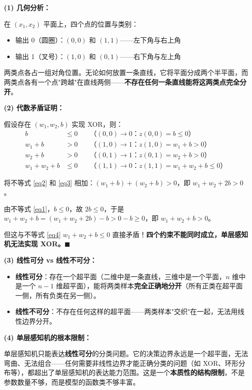 \documentclass[a4paper,11pt]{ctexart}
\begin{document}
\begin{solutionbox}[参考答案与详细解析]
    \textbf{(1) 几何分析：}

    在 $(x_1, x_2)$ 平面上，四个点的位置与类别：
    \begin{itemize}
        \item 输出 0（圆圈）：$(0,0)$ 和 $(1,1)$——左下角与右上角
        \item 输出 1（叉号）：$(1,0)$ 和 $(0,1)$——右下角与左上角
    \end{itemize}

    两类点各占一组对角位置。无论如何放置一条直线，它将平面分成两个半平面，而两类点各有一个点"跨越"在直线两侧——\textbf{不存在任何一条直线能将这两类点完全分开}。

    \textbf{(2) 代数矛盾证明：}

    假设存在 $(w_1, w_2, b)$ 实现 XOR，则：
    \begin{align}
        b &\leq 0 \quad &\text{（$(0,0) \to 0$：$z(0,0) = b \leq 0$）} \label{eq1}\\
        w_1 + b &> 0 \quad &\text{（$(1,0) \to 1$：$z(1,0) = w_1 + b > 0$）} \label{eq2}\\
        w_2 + b &> 0 \quad &\text{（$(0,1) \to 1$：$z(0,1) = w_2 + b > 0$）} \label{eq3}\\
        w_1 + w_2 + b &\leq 0 \quad &\text{（$(1,1) \to 0$：$z(1,1) = w_1 + w_2 + b \leq 0$）} \label{eq4}
    \end{align}

    将不等式 \eqref{eq2} 和 \eqref{eq3} 相加：$(w_1 + b) + (w_2 + b) > 0$，即 $w_1 + w_2 + 2b > 0$。

    由不等式 \eqref{eq1}，$b \leq 0$，故 $2b \leq 0$，于是 $w_1 + w_2 + b = (w_1 + w_2 + 2b) - b > 0 - b \geq 0$，即 $w_1 + w_2 + b > 0$。

    但这与不等式 \eqref{eq4} $w_1 + w_2 + b \leq 0$ 直接矛盾！\textbf{四个约束不能同时成立，单层感知机无法实现 XOR。}$\blacksquare$

    \textbf{(3) 线性可分 vs 线性不可分：}

    \begin{keybox}[线性可分的定义]
        \begin{itemize}
            \item \textbf{线性可分}：存在一个超平面（二维中是一条直线，三维中是一个平面，$n$ 维中是一个 $n-1$ 维超平面），能将两类样本\textbf{完全正确地分开}（所有正类在超平面一侧，所有负类在另一侧）。
            \item \textbf{线性不可分}：不存在任何这样的超平面——两类样本"交织"在一起，无法用线性边界分开。
        \end{itemize}
    \end{keybox}

    \textbf{(4) 单层感知机的根本限制：}

    单层感知机只能表达\textbf{线性可分}的分类问题。它的决策边界永远是一个超平面，无法弯曲、无法组合——任何需要非线性边界才能正确分类的问题（如 XOR、环形分布等），都超出了单层感知机的表达能力范围。这是一个\textbf{本质性的结构限制}，不是参数数量不够，而是模型的函数类不够丰富。
\end{solutionbox}
\end{document}
